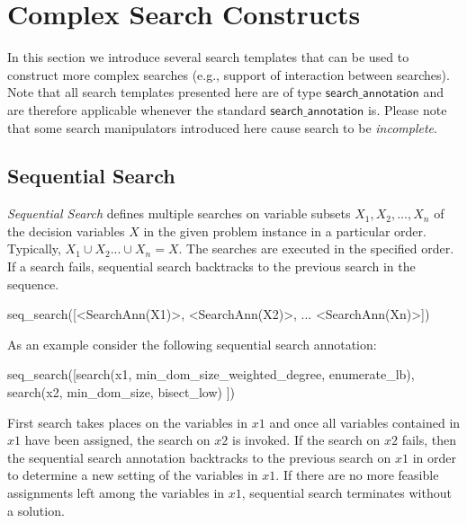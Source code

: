 \documentclass[a4paper]{article}
\newcommand{\fzsf}[1]{\ensuremath{\mathsf{#1}}}
\newcommand{\fzsearchannotation}{\fzsf{search\_annotation}}
\newcommand{\vblabel}[1]	{\large\textbf{#1}}
\begin{document}


\section{Complex Search Constructs}
\label{sec:manipulators}

In this section we introduce several search templates that can be used to
construct more complex searches (e.g., support of interaction between
searches).  Note that all search templates presented here are of type
\fzsearchannotation{} and are therefore applicable whenever the standard
\fzsearchannotation{} is. 
Please note that some search manipulators introduced here cause search to be \emph{incomplete}.

\subsection{Sequential Search}

\emph{Sequential Search} defines multiple searches on variable subsets
$X_1, X_2, \ldots, X_n$ of the decision variables $X$ in the given problem
instance in a particular order.  Typically, $X_1 \cup X_2 ...  \cup X_n = X$.
The searches are executed in the specified order.  If a search
fails, sequential search backtracks to the previous search in the sequence.

\begin{Zinc}[label={\vblabel{Sequential Search}}]
seq_search([<SearchAnn(X1)>, <SearchAnn(X2)>, ... <SearchAnn(Xn)>])
\end{Zinc}

As an example consider the following sequential search annotation:

\begin{Zinc}[label={\vblabel{Example: Sequential Search}}]
seq_search([search(x1, min_dom_size_weighted_degree, enumerate_lb),
            search(x2, min_dom_size, bisect_low)
           ])
\end{Zinc}

First search takes places on the variables in $x1$ and once all variables
contained in $x1$ have been assigned, the search on $x2$ is invoked.  If the
search on $x2$ fails, then the sequential search annotation backtracks to the
previous search on $x1$ in order to determine a new setting of the variables in
$x1$.  If there are no more feasible assignments left among the variables in
$x1$, sequential search terminates without a solution.
\end{document}

